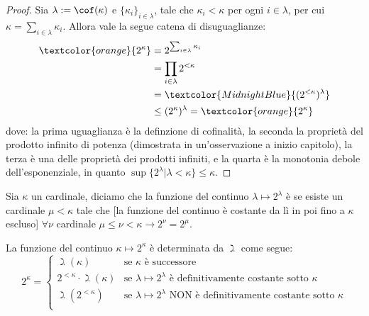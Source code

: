 \documentclass[11pt]{scrartcl}
\begin{document}
\begin{proof}
	Sia $\lambda := \cof(\kappa)$ e $\{\kappa_i\}_{i \in \lambda}$, tale che $\kappa_i < \kappa$ per ogni $i \in \lambda$, per cui $\kappa = \sum_{i \in \lambda}\kappa_i$. Allora vale la segue catena di disuguaglianze:
	\[ \begin{split}
		\textcolor{orange}{2^\kappa} &= 2^{\sum_{i \in \lambda}\kappa_i} \\
									 &= \prod_{i \in \lambda} 2^{<\kappa} \\
									 &= \textcolor{MidnightBlue}{(2^{<\kappa})^\lambda} \\
									 &\leq (2^\kappa)^\lambda = \textcolor{orange}{2^\kappa}
	\end{split}
		\]
	dove: la prima uguaglianza è la definzione di cofinalità, la seconda la proprietà del prodotto infinito di potenza (dimostrata in un'osservazione a inizio capitolo), la terza è una delle proprietà dei prodotti infiniti,
	e la quarta è la monotonia debole dell'esponenziale, in quanto $\sup\{2^{\lambda}|\lambda < \kappa\} \leq \kappa$.
\end{proof}

\begin{definition}
	Sia $\kappa$ un cardinale, diciamo che la funzione del continuo $\lambda \mapsto 2^\lambda$ è  se esiste un cardinale $\mu < \kappa$ tale che [la funzione del
	continuo è costante da lì in poi fino a $\kappa$ escluso] $\forall \nu$ cardinale $\mu \leq \nu < \kappa \rightarrow 2^\nu = 2^\mu$.
\end{definition}

\begin{proposition}
	La funzione del continuo $\kappa \mapsto 2^{\kappa}$ è determinata da $\gimel$ come segue:
	\[ 2^{\kappa} = \begin{cases}
		\gimel(\kappa) &\text{se $\kappa$ è successore} \\
		2^{<\kappa} \cdot \gimel(\kappa) &\text{se $\lambda \mapsto 2^\lambda$ è definitivamente costante sotto $\kappa$} \\
		\gimel(2^{<\kappa}) &\text{se $\lambda \mapsto 2^\lambda$ NON è definitivamente costante sotto $\kappa$} \\
	\end{cases}
		\]
\end{proposition}
\end{document}

